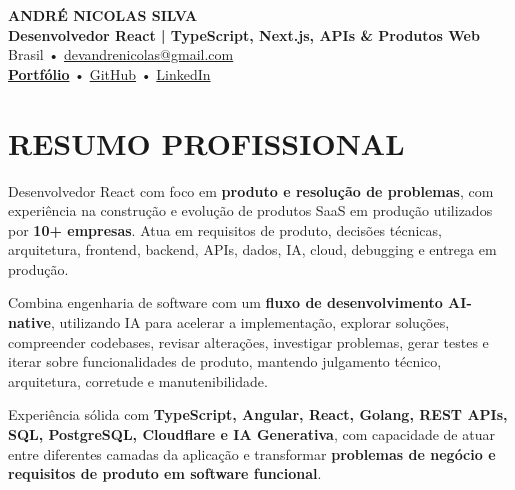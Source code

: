 \documentclass[10pt,a4paper]{article}
\begin{document}

\begin{center}

    {\LARGE \textbf{ANDRÉ NICOLAS SILVA}} \\[-2pt]

    {\normalsize \textbf{Desenvolvedor React | TypeScript, Next.js, APIs \& Produtos Web}} \\[1pt]

    \footnotesize
    Brasil \quad • \quad
    \href{mailto:devandrenicolas@gmail.com}{devandrenicolas@gmail.com} \\[-1pt]

    \textbf{\href{https://portfolio-andrenicolas.vercel.app}{Portfólio}}
    \quad • \quad
    \href{https://github.com/devAndreNicolas}{GitHub}
    \quad • \quad
    \href{https://www.linkedin.com/in/devandrenicolas}{LinkedIn}

\end{center}

\vspace{-3pt}


\section*{RESUMO PROFISSIONAL}

\footnotesize

Desenvolvedor React com foco em \textbf{produto e resolução de
problemas}, com experiência na construção e evolução de produtos SaaS
em produção utilizados por \textbf{10+ empresas}. Atua em requisitos
de produto, decisões técnicas, arquitetura, frontend, backend, APIs,
dados, IA, cloud, debugging e entrega em produção.

Combina engenharia de software com um \textbf{fluxo de desenvolvimento
AI-native}, utilizando IA para acelerar a implementação, explorar
soluções, compreender codebases, revisar alterações, investigar
problemas, gerar testes e iterar sobre funcionalidades de produto,
mantendo julgamento técnico, arquitetura, corretude e
manutenibilidade.

Experiência sólida com \textbf{TypeScript, Angular, React, Golang,
REST APIs, SQL, PostgreSQL, Cloudflare e IA Generativa}, com capacidade
de atuar entre diferentes camadas da aplicação e transformar
\textbf{problemas de negócio e requisitos de produto em software
funcional}.
\end{document}
